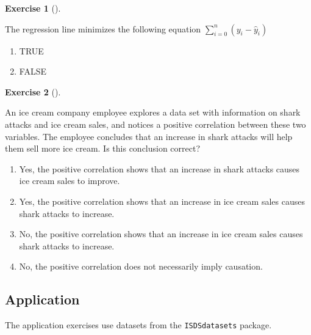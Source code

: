 \documentclass[
  letterpaper,
  DIV=11,
  numbers=noendperiod]{scrreprt}
\providecommand{\tightlist}{%
  \setlength{\itemsep}{0pt}\setlength{\parskip}{0pt}}\usepackage{longtable,booktabs,array}
\theoremstyle{definition}
\newtheorem{exercise}{Exercise}[chapter]
\theoremstyle{remark}
\begin{document}
\begin{exercise}[]\protect\hypertarget{exr-ch05-c10}{}\label{exr-ch05-c10}

The regression line minimizes the following equation
\(\sum_{i=0}^{n}(y_i-\hat{y}_i)\)

\begin{enumerate}
\def\labelenumi{\alph{enumi})}
\tightlist
\item
  TRUE
\item
  FALSE
\end{enumerate}

\end{exercise}

\begin{exercise}[]\protect\hypertarget{exr-ch05-c11}{}\label{exr-ch05-c11}

An ice cream company employee explores a data set with information on
shark attacks and ice cream sales, and notices a positive correlation
between these two variables. The employee concludes that an increase in
shark attacks will help them sell more ice cream. Is this conclusion
correct?

\begin{enumerate}
\def\labelenumi{\alph{enumi})}
\tightlist
\item
  Yes, the positive correlation shows that an increase in shark attacks
  causes ice cream sales to improve.
\item
  Yes, the positive correlation shows that an increase in ice cream
  sales causes shark attacks to increase.
\item
  No, the positive correlation shows that an increase in ice cream sales
  causes shark attacks to increase.
\item
  No, the positive correlation does not necessarily imply causation.
\end{enumerate}

\end{exercise}

\hypertarget{sec-ex05-application}{%
\subsection{Application}\label{sec-ex05-application}}

The application exercises use datasets from the \texttt{ISDSdatasets}
package.
\end{document}
